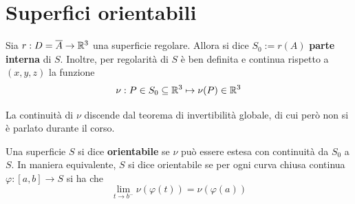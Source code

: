 \section{Superfici orientabili}
Sia $r: D=\overline{A} \to \mathbb{R}^3$ una superficie regolare. Allora si dice $S_0:= r(A)$ \textbf{parte interna} di $S$. Inoltre, per regolarità di $S$ è ben definita e continua rispetto a $(x,y,z)$ la funzione
\begin{equation}
    \nu: P \in S_0 \subseteq \mathbb{R}^3 \mapsto \nu(P) \in \mathbb{R}^3
\end{equation}
\begin{oss}
    La continuità di $\nu$ discende dal teorema di invertibilità globale, di cui però non si è parlato durante il corso.
\end{oss}
\begin{definition} \label{Def: Superficie orientabile}
Una superficie $S$ si dice \textbf{orientabile} se $\nu$ può essere estesa con continuità da $S_0$ a $S$. In maniera equivalente, $S$ si dice orientabile se per ogni curva chiusa continua $\varphi: [a,b] \to S$ si ha che
\begin{equation}
    \lim_{t \to b^-}{\nu(\varphi(t))}=\nu(\varphi(a))
\end{equation}
\end{definition}
